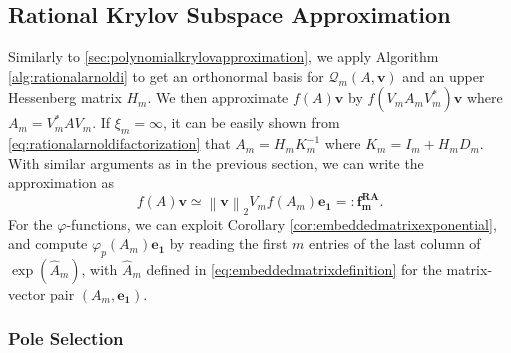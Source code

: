 \subsection{Rational Krylov Subspace Approximation}
\label{sec:rationalkrylovapproximation}
Similarly to \autoref{sec:polynomialkrylovapproximation}, we apply Algorithm \ref{alg:rationalarnoldi}
to get an orthonormal basis for $\mathcal{Q}_m(A, \mathbf{v})$ and an upper Hessenberg matrix $H_m$.
We then approximate $f(A)\mathbf{v}$ by $f(V_m A_m V_m^*)\mathbf{v}$ where $A_m = V_m^* A V_m$.
If $\xi_m = \infty$, it can be easily shown from \eqref{eq:rationalarnoldifactorization} that
$A_m = H_m K_m^{-1}$ where $K_m = I_m + H_m D_m$. With similar arguments as in the previous
section, we can write the approximation as
\begin{equation}
    \label{eq:rationalkrylovapproximation}
    f(A)\mathbf{v} \simeq \left\| \mathbf{v} \right\|_{2} V_m f(A_m) \mathbf{e_1} =: \mathbf{f_{m}^{RA}}.
\end{equation}
For the $\varphi$-functions, we can exploit Corollary \ref{cor:embeddedmatrixexponential},
and compute $\varphi_p(A_m) \mathbf{e_1}$ by reading the first $m$ entries of the last column of
$\exp(\hat{A}_m)$, with $\hat{A}_m$ defined in \eqref{eq:embeddedmatrixdefinition}
for the matrix-vector pair $(A_m, \mathbf{e_1})$.

\subsubsection{Pole Selection}


